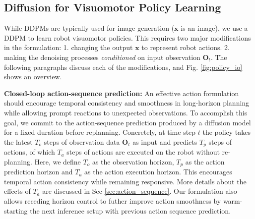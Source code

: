\subsection{Diffusion for Visuomotor Policy Learning} 

While DDPMs are typically used for image generation ($\mathbf{x}$ is an image), we use a DDPM to learn robot visuomotor policies. This requires two major modifications in the formulation: 
1. changing the output $\mathbf{x}$  to represent robot actions.  
2. making the denoising processes \textit{conditioned} on input observation $\mathbf{O}_t$. 
The following paragraphs discuss each of the modifications, and Fig. \ref{fig:policy_io} shows an overview. 

\textbf{Closed-loop action-sequence prediction:}
An effective action formulation should encourage temporal consistency and smoothness in long-horizon planning while allowing prompt reactions to unexpected observations. 
To accomplish this goal, we commit to the action-sequence prediction produced by a diffusion model for a fixed duration before replanning. 
Concretely, at time step $t$ the policy takes the latest $T_o$ steps of observation data $\mathbf{O}_t$ as input and predicts $T_p$ steps of actions, of which $T_a$ steps of actions are executed on the robot without re-planning. Here, we define $T_o$ as the observation horizon, $T_p$ as the action prediction horizon and $T_a$ as the action execution horizon. 
This encourages temporal action consistency while remaining responsive. More details about the effects of $T_a$ are discussed in Sec \ref{sec:action_sequence}.
Our formulation also allows receding horizon control \cite{mayne1988receding} to futher improve action smoothness by warm-starting the next inference setup with previous action sequence prediction.




